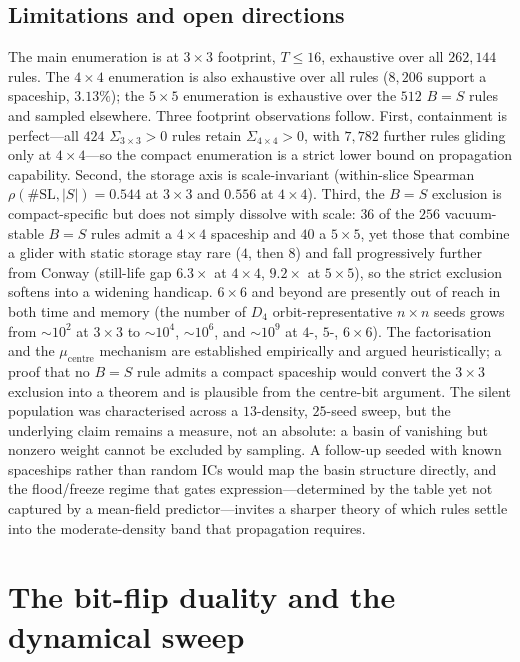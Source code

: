 \documentclass{article}
\begin{document}
\subsection{Limitations and open directions}
\label{sec:disc-limits}

The main enumeration is at $3{\times}3$ footprint, $T\le16$, exhaustive over all
$262{,}144$ rules. The $4{\times}4$ enumeration is also exhaustive over all rules
($8{,}206$ support a spaceship, $3.13\%$); the $5{\times}5$ enumeration is
exhaustive over the $512$ $B=S$ rules and sampled elsewhere. Three footprint
observations follow. First, containment is perfect---all $424$
$\Sigma_{3\times3}>0$ rules retain $\Sigma_{4\times4}>0$, with $7{,}782$ further
rules gliding only at $4{\times}4$---so the compact enumeration is a strict lower
bound on propagation capability. Second, the storage axis is scale-invariant
(within-slice Spearman $\rho(\#\mathrm{SL}, |S|) = 0.544$ at $3{\times}3$ and
$0.556$ at $4{\times}4$). Third, the $B=S$ exclusion is compact-specific but does
not simply dissolve with scale: $36$ of the $256$ vacuum-stable $B=S$ rules admit
a $4{\times}4$ spaceship and $40$ a $5{\times}5$, yet those that combine a glider
with static storage stay rare ($4$, then $8$) and fall progressively further from
Conway (still-life gap $6.3\times$ at $4{\times}4$, $9.2\times$ at $5{\times}5$),
so the strict exclusion softens into a widening handicap. $6{\times}6$ and beyond
are presently out of reach in both time and memory (the number of $D_4$
orbit-representative $n{\times}n$ seeds grows from $\sim10^2$ at $3{\times}3$ to
$\sim10^4$, $\sim10^6$, and $\sim10^9$ at $4$-, $5$-, $6{\times}6$).
The factorisation and the $\mu_{\text{centre}}$ mechanism are established
empirically and argued heuristically; a proof that no $B=S$ rule admits a compact
spaceship would convert the $3{\times}3$ exclusion into a theorem and is plausible
from the centre-bit argument. The silent population was characterised across a
$13$-density, $25$-seed sweep, but the underlying claim remains a measure, not an
absolute: a basin of vanishing but nonzero weight cannot be excluded by sampling.
A follow-up seeded with known spaceships rather than random ICs would map the
basin structure directly, and the flood/freeze regime that gates
expression---determined by the table yet not captured by a mean-field
predictor---invites a sharper theory of which rules settle into the
moderate-density band that propagation requires.

\appendix
\section{The bit-flip duality and the dynamical sweep}
\label{app:dynamical}
\end{document}
